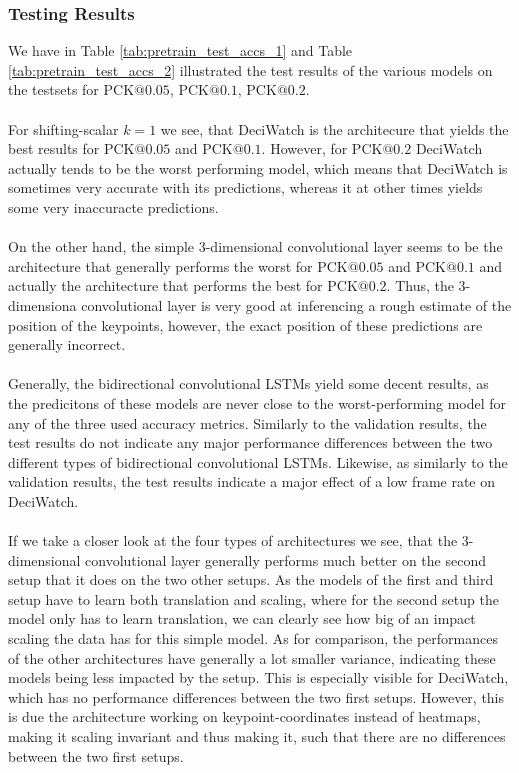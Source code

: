 \documentclass[./main.tex]{subfiles}
\begin{document}
\subsubsection{Testing Results}
We have in Table \ref{tab:pretrain_test_accs_1} and Table \ref{tab:pretrain_test_accs_2} illustrated the test results of the various models on the testsets for PCK$@0.05$, PCK$@0.1$, PCK$@0.2$.
\\
\\
For shifting-scalar $k = 1$ we see, that DeciWatch is the architecure that yields the best results for PCK$@0.05$ and PCK$@0.1$. However, for PCK$@0.2$ DeciWatch actually tends to be the worst performing model, which means that DeciWatch is sometimes very accurate with its predictions, whereas it at other times yields some very inaccuracte predictions.
\\
\\
On the other hand, the simple 3-dimensional convolutional layer seems to be the architecture that generally performs the worst for PCK$@0.05$ and PCK$@0.1$ and actually the architecture that performs the best for PCK$@0.2$. Thus, the 3-dimensiona convolutional layer is very good at inferencing a rough estimate of the position of the keypoints, however, the exact position of these predictions are generally incorrect.
\\
\\
Generally, the bidirectional convolutional LSTMs yield some decent results, as the predicitons of these models are never close to the worst-performing model for any of the three used accuracy metrics. Similarly to the validation results, the test results do not indicate any major performance differences between the two different types of bidirectional convolutional LSTMs. Likewise, as similarly to the validation results, the test results indicate a major effect of a low frame rate on DeciWatch. 
\\
\\
If we take a closer look at the four types of architectures we see, that the 3-dimensional convolutional layer generally performs much better on the second setup that it does on the two other setups. As the models of the first and third setup have to learn both translation and scaling, where for the second setup the model only has to learn translation, we can clearly see how big of an impact scaling the data has for this simple model. As for comparison, the performances of the other architectures have generally a lot smaller variance, indicating these models being less impacted by the setup. This is especially visible for DeciWatch, which has no performance differences between the two first setups. However, this is due the architecture working on keypoint-coordinates instead of heatmaps, making it scaling invariant and thus making it, such that there are no differences between the two first setups.
\end{document}
